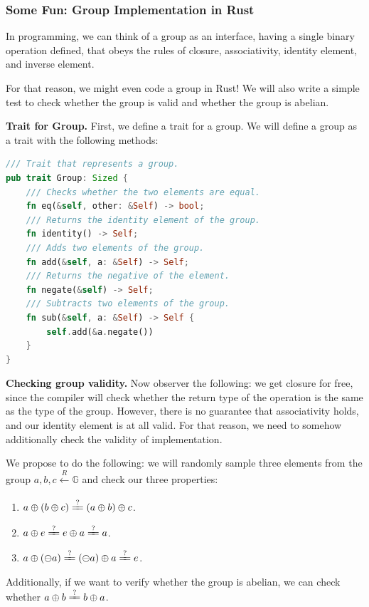 \documentclass[../lecture-notes.tex]{subfiles}
\begin{document}
\subsubsection{Some Fun: Group Implementation in Rust}

In programming, we can think of a group as an interface, having a single binary operation defined, that obeys the rules of closure, associativity, identity element, and inverse element.

For that reason, we might even code a group in Rust! We will also write a simple test to check whether the group is valid and whether the group is abelian.

\textbf{Trait for Group.} First, we define a trait for a group. We will define a group as a trait with the following methods:
\begin{lstlisting}[language=Rust]
/// Trait that represents a group.
pub trait Group: Sized {
    /// Checks whether the two elements are equal.
    fn eq(&self, other: &Self) -> bool;
    /// Returns the identity element of the group.
    fn identity() -> Self;
    /// Adds two elements of the group.
    fn add(&self, a: &Self) -> Self;
    /// Returns the negative of the element.
    fn negate(&self) -> Self;
    /// Subtracts two elements of the group.
    fn sub(&self, a: &Self) -> Self {
        self.add(&a.negate())
    }
}
\end{lstlisting}

\textbf{Checking group validity.} Now observer the following: we get closure for free, since the compiler will check whether the return type of the operation is the same as the type of the group. 
However, there is no guarantee that associativity holds, and our identity element is at all valid. For that reason, we need to somehow additionally check the
validity of implementation.

We propose to do the following: we will randomly sample three elements from the group $a,b,c \xleftarrow[]{R} \mathbb{G}$ and check our three properties:
\begin{enumerate}
    \item $a \oplus (b \oplus c) \xlongequal{?} (a \oplus b) \oplus c$.
    \item $a \oplus e \xlongequal{?} e \oplus a \xlongequal{?} a $.
    \item $a \oplus (\ominus a) \xlongequal{?} (\ominus a) \oplus a \xlongequal{?} e$.
\end{enumerate}

Additionally, if we want to verify whether the group is abelian, we can check whether $a \oplus b \xlongequal{?} b \oplus a$. 
\end{document}
